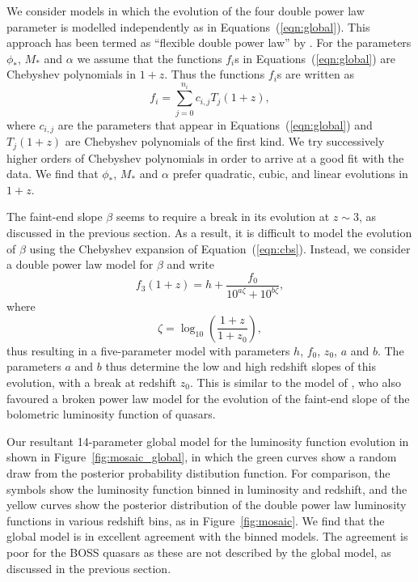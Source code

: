 \documentclass[a4paper,fleqn,usenatbib]{mnras}
\begin{document}
We consider models in which the evolution of the four double power law
parameter is modelled independently as in
Equations~(\ref{eqn:global}).  This approach has been termed as
``flexible double power law'' by \citet{2015MNRAS.451.1892A}.  For the
parameters $\phi_*$, $M_*$ and $\alpha$ we assume that the functions
$f_i$s in Equations~(\ref{eqn:global}) are Chebyshev polynomials in
$1+z$.  Thus the functions $f_i$s are written as
\begin{equation}
  f_i=\sum_{j=0}^{n_i}c_{i,j}T_j(1+z),
  \label{eqn:cbs}
\end{equation}
where $c_{i,j}$ are the parameters that appear in
Equations~(\ref{eqn:global}) and $T_j(1+z)$ are Chebyshev polynomials
of the first kind.  We try successively higher orders of Chebyshev
polynomials in order to arrive at a good fit with the data.  We find
that $\phi_*$, $M_*$ and $\alpha$ prefer quadratic, cubic, and linear
evolutions in $1+z$.

The faint-end slope $\beta$ seems to require a break in its evolution
at $z\sim 3$, as discussed in the previous section.  As a result, it
is difficult to model the evolution of $\beta$ using the Chebyshev
expansion of Equation~(\ref{eqn:cbs}).  Instead, we consider a double
power law model for $\beta$ and write
\begin{equation}
  f_3(1+z)=h+\frac{f_0}{10^{a\zeta}+10^{b\zeta}},
\end{equation}
where
\begin{equation}
  \zeta = \log_{10}\left(\frac{1+z}{1+z_0}\right),
\end{equation}
thus resulting in a five-parameter model with parameters $h$, $f_0$,
$z_0$, $a$ and $b$.  The parameters $a$ and $b$ thus determine the low
and high redshift slopes of this evolution, with a break at redshift
$z_0$.  This is similar to the model of \citet{2007ApJ...654..731H},
who also favoured a broken power law model for the evolution of the
faint-end slope of the bolometric luminosity function of quasars.

Our resultant 14-parameter global model for the luminosity function
evolution in shown in Figure~\ref{fig:mosaic_global}, in which the
green curves show a random draw from the posterior probability
distibution function.  For comparison, the symbols show the luminosity
function binned in luminosity and redshift, and the yellow curves show
the posterior distribution of the double power law luminosity
functions in various redshift bins, as in Figure~\ref{fig:mosaic}.  We
find that the global model is in excellent agreement with the binned
models.  The agreement is poor for the BOSS quasars as these are not
described by the global model, as discussed in the previous section.
\end{document}

